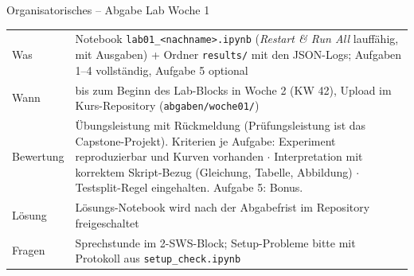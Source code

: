 \documentclass[11pt,a4paper]{article}
\newcommand{\code}[1]{\texttt{#1}}
\begin{document}
\begin{orgbox}{Organisatorisches -- Abgabe Lab Woche 1}
\small
\begin{tabularx}{\textwidth}{@{}p{2.6cm}X@{}}
Was & Notebook \code{lab01\_<nachname>.ipynb} (\emph{Restart \& Run All} lauffähig, mit Ausgaben) + Ordner \code{results/} mit den JSON-Logs; Aufgaben 1--4 vollständig, Aufgabe 5 optional \\
Wann & bis zum Beginn des Lab-Blocks in Woche 2 (KW 42), Upload im Kurs-Repository (\code{abgaben/woche01/}) \\
Bewertung & Übungsleistung mit Rückmeldung (Prüfungsleistung ist das Capstone-Projekt). Kriterien je Aufgabe: Experiment reproduzierbar und Kurven vorhanden $\cdot$ Interpretation mit korrektem Skript-Bezug (Gleichung, Tabelle, Abbildung) $\cdot$ Testsplit-Regel eingehalten. Aufgabe 5: Bonus. \\
Lösung & Lösungs-Notebook wird nach der Abgabefrist im Repository freigeschaltet \\
Fragen & Sprechstunde im 2-SWS-Block; Setup-Probleme bitte mit Protokoll aus \code{setup\_check.ipynb}
\end{tabularx}
\end{orgbox}
\end{document}
